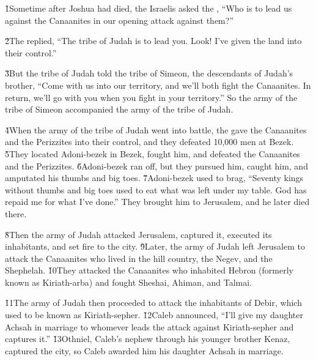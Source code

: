 


\v{1}Sometime after Joshua had died, the Israelis asked the , ``Who is to lead us against the Canaanites in our opening attack against them?''

\v{2}The  replied, ``The tribe of Judah is to lead you. Look! I've given the land into their control.''

\v{3}But the tribe of Judah told the tribe of Simeon, the descendants of Judah's brother, ``Come with us into our territory, and we'll both fight the Canaanites. In return, we'll go with you when you fight in your territory.'' So the army of the tribe of Simeon accompanied the army of the tribe of Judah.

\v{4}When the army of the tribe of Judah went into battle, the  gave the Canaanites and the Perizzites into their control, and they defeated 10,000 men at Bezek. \v{5}They located Adoni-bezek in Bezek, fought him, and defeated the Canaanites and the Perizzites. \v{6}Adoni-bezek ran off, but they pursued him, caught him, and amputated his thumbs and big toes. \v{7}Adoni-bezek used to brag, ``Seventy kings without thumbs and big toes used to eat what was left under my table. God has repaid me for what I've done.'' They brought him to Jerusalem, and he later died there.

\v{8}Then the army of Judah attacked Jerusalem, captured it, executed its inhabitants, and set fire to the city. \v{9}Later, the army of Judah left Jerusalem to attack the Canaanites who lived in the hill country, the Negev, and the Shephelah. \v{10}They attacked the Canaanites who inhabited Hebron (formerly known as Kiriath-arba) and fought Sheshai, Ahiman, and Talmai.

\v{11}The army of Judah then proceeded to attack the inhabitants of Debir, which used to be known as Kiriath-sepher. \v{12}Caleb announced, ``I'll give my daughter Achsah in marriage to whomever leads the attack against Kiriath-sepher and captures it.'' \v{13}Othniel, Caleb's nephew through his younger brother Kenaz, captured the city, so Caleb awarded him his daughter Achsah in marriage.

